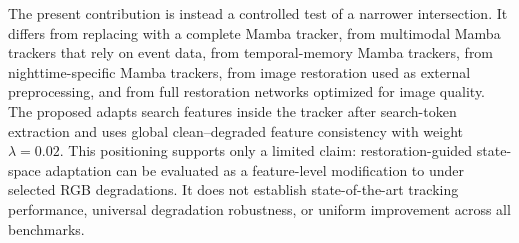 The present contribution is instead a controlled test of a narrower intersection. It differs from replacing \baseline{} with a complete Mamba tracker, from multimodal Mamba trackers that rely on event data, from temporal-memory Mamba trackers, from nighttime-specific Mamba trackers, from image restoration used as external preprocessing, and from full restoration networks optimized for image quality. The proposed \method{} adapts search features inside the tracker after search-token extraction and uses global clean--degraded feature consistency with weight $\lambda=0.02$. This positioning supports only a limited claim: restoration-guided state-space adaptation can be evaluated as a feature-level modification to \baseline{} under selected RGB degradations. It does not establish state-of-the-art tracking performance, universal degradation robustness, or uniform improvement across all benchmarks.
